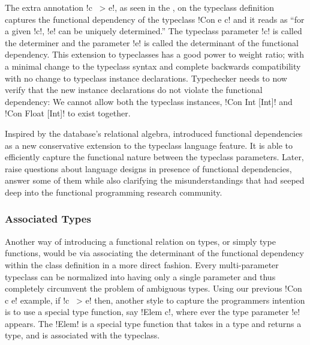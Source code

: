 \documentclass[screen,nonacm]{acmart}
\begin{document}
The extra annotation !c ~> e!, as seen in the ,
on the typeclass definition captures the functional dependency of the typeclass
!Con e c! and it reads as ``for a given !c!, !e! can be uniquely
determined.'' The typeclass parameter !c! is called the determiner
and the parameter !e! is called the determinant of the
functional dependency. This extension to typeclasses has a good power
to weight ratio; with a minimal change to the typeclass syntax and
complete backwards compatibility with no change to typeclass instance declarations.
Typechecker needs to now verify that the new instance declarations do
not violate the functional dependency: We cannot allow both the typeclass instances,
!Con Int [Int]! and !Con Float [Int]! to exist together.

Inspired by the database's relational algebra, \citet{jones_tcfd_2000}
introduced functional dependencies as a new conservative extension to
the typeclass language feature. It is able to efficiently capture
the functional nature between the typeclass parameters. Later,
\citet{jones_language_2008} raise questions about language designs in
presence of functional dependencies,  answer some of them while also
clarifying the misunderstandings that had seeped deep into the
functional programming research community.

\subsubsection{Associated Types}
Another way of introducing a functional relation on types, or simply
type functions, would be via associating the determinant of the
functional dependency within the class
definition in a more direct fashion.
Every multi-parameter typeclass can be normalized into having only a single
parameter and thus completely circumvent the problem of
ambiguous types. Using our previous !Con c e! example, if !c ~> e! then,
another style to capture the programmers intention is to use a special
type function, say !Elem c!, where ever the type parameter
!e! appears. The !Elem! is a special type function that takes in a type
and returns a type, and is associated with the typeclass.
\end{document}

